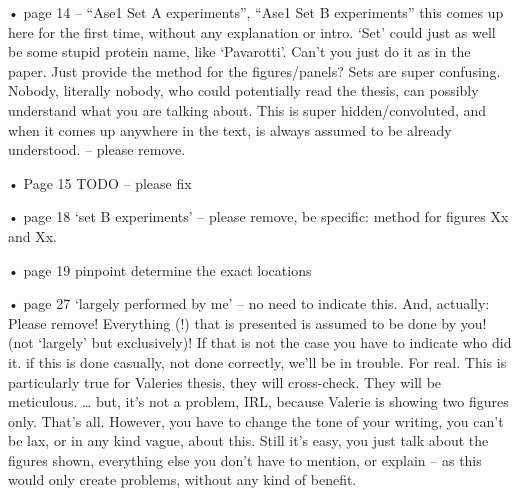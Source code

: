 

• page 14 – “Ase1 Set A experiments”, “Ase1 Set B experiments” this comes up here for the first time, without any explanation or intro. ‘Set’ could just as well be some stupid protein name, like ‘Pavarotti’. Can’t you just do it as in the paper. Just provide the method for the figures/panels? Sets are super confusing. Nobody, literally nobody, who could potentially read the thesis, can possibly understand what you are talking about. This is super hidden/convoluted, and when it comes up anywhere in the text, is always assumed to be already understood. – please remove.

• Page 15 TODO – please fix




• page 18  ‘set B experiments’ – please remove, be specific: method for figures Xx and Xx.


• page 19 pinpoint determine the exact locations

• page 27 ‘largely performed by me’ – no need to indicate this. And, actually: Please remove! Everything (!) that is presented is assumed to be done by you! (not ‘largely’ but exclusively)! If that is not the case you have to indicate who did it. if this is done casually, not done correctly, we’ll be in trouble. For real. This is particularly true for Valeries thesis, they will cross-check. They will be meticulous. … but, it’s not a problem, IRL, because Valerie is showing two figures only. That’s all. However, you have to change the tone of your writing, you can’t be lax, or in any kind vague, about this. Still it’s easy, you just talk about the figures shown, everything else you don’t have to mention, or explain – as this would only create problems, without any kind of benefit.

